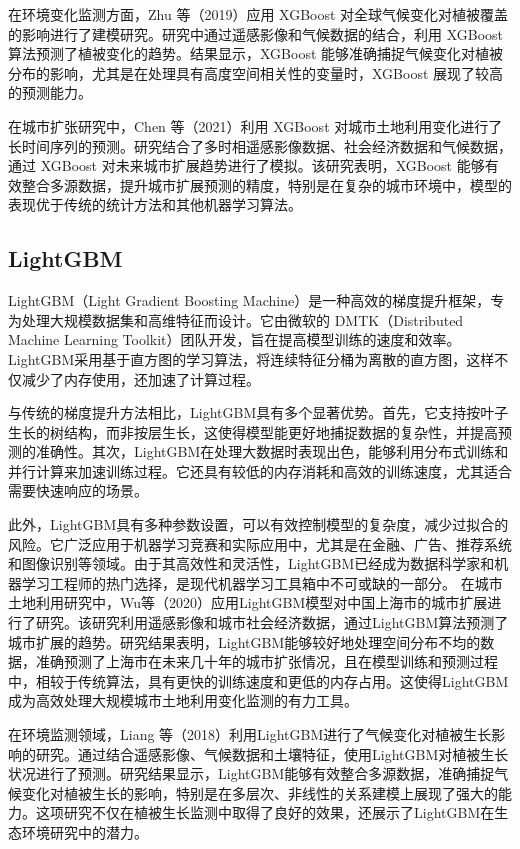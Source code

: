 \documentclass[AutoFakeBold]{LZUThesis-PgD&PhD}
\begin{document}
	在环境变化监测方面，Zhu 等（2019）应用 XGBoost 对全球气候变化对植被覆盖的影响进行了建模研究\cite{zhu2019}。研究中通过遥感影像和气候数据的结合，利用 XGBoost 算法预测了植被变化的趋势。结果显示，XGBoost 能够准确捕捉气候变化对植被分布的影响，尤其是在处理具有高度空间相关性的变量时，XGBoost 展现了较高的预测能力。
	
	在城市扩张研究中，Chen 等（2021）利用 XGBoost 对城市土地利用变化进行了长时间序列的预测\cite{chen2021}。研究结合了多时相遥感影像数据、社会经济数据和气候数据，通过 XGBoost 对未来城市扩展趋势进行了模拟。该研究表明，XGBoost 能够有效整合多源数据，提升城市扩展预测的精度，特别是在复杂的城市环境中，模型的表现优于传统的统计方法和其他机器学习算法。
	
	
	
	\subsection{LightGBM}
	LightGBM（Light Gradient Boosting Machine）是一种高效的梯度提升框架，专为处理大规模数据集和高维特征而设计。它由微软的 DMTK（Distributed Machine Learning Toolkit）团队开发，旨在提高模型训练的速度和效率。LightGBM采用基于直方图的学习算法，将连续特征分桶为离散的直方图，这样不仅减少了内存使用，还加速了计算过程。
	
	与传统的梯度提升方法相比，LightGBM具有多个显著优势。首先，它支持按叶子生长的树结构，而非按层生长，这使得模型能更好地捕捉数据的复杂性，并提高预测的准确性。其次，LightGBM在处理大数据时表现出色，能够利用分布式训练和并行计算来加速训练过程。它还具有较低的内存消耗和高效的训练速度，尤其适合需要快速响应的场景。
	
	此外，LightGBM具有多种参数设置，可以有效控制模型的复杂度，减少过拟合的风险。它广泛应用于机器学习竞赛和实际应用中，尤其是在金融、广告、推荐系统和图像识别等领域。由于其高效性和灵活性，LightGBM已经成为数据科学家和机器学习工程师的热门选择，是现代机器学习工具箱中不可或缺的一部分。
	在城市土地利用研究中，Wu等（2020）应用LightGBM模型对中国上海市的城市扩展进行了研究\cite{wu2020}。该研究利用遥感影像和城市社会经济数据，通过LightGBM算法预测了城市扩展的趋势。研究结果表明，LightGBM能够较好地处理空间分布不均的数据，准确预测了上海市在未来几十年的城市扩张情况，且在模型训练和预测过程中，相较于传统算法，具有更快的训练速度和更低的内存占用。这使得LightGBM成为高效处理大规模城市土地利用变化监测的有力工具。
	
	在环境监测领域，Liang 等（2018）利用LightGBM进行了气候变化对植被生长影响的研究\cite{liang2018}。通过结合遥感影像、气候数据和土壤特征，使用LightGBM对植被生长状况进行了预测。研究结果显示，LightGBM能够有效整合多源数据，准确捕捉气候变化对植被生长的影响，特别是在多层次、非线性的关系建模上展现了强大的能力。这项研究不仅在植被生长监测中取得了良好的效果，还展示了LightGBM在生态环境研究中的潜力。
	
\end{document}

